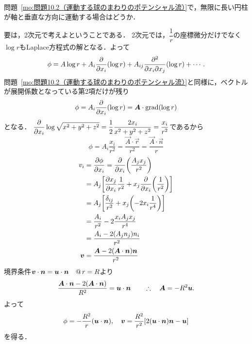 \begin{mondai}{}{}
問題~\ref{mo:問題10.2（運動する球のまわりのポテンシャル流）}で，無限に長い円柱が軸と垂直な方向に運動する場合はどうか．
\end{mondai}
\begin{kaitou}
要は，2次元で考えよということである．
2次元では，$\dfrac{1}{r}$の座標微分だけでなく$\log r$もLaplace方程式の解となる．よって
\[
    \phi = A \log r+ A_i \pdv{x_i}(\log r)  + A_{ij} \pdv{}{x_i}{x_j} {(\log r)} + \cdots .
\]
問題~\ref{mo:問題10.2（運動する球のまわりのポテンシャル流）}と同様に，ベクトルが展開係数となっている第2項だけが残り
\[
    \phi = A_i \pdv{x_i}(\log r) = \vb*{A} \cdot \operatorname{grad} (\log r)
\]
となる．
$\dpdv{x_i} \log\sqrt{x^2+y^2+z^2} = \dfrac{1}{2} \dfrac{2x_i}{x^2+y^2+z^2} = \frac{x_i}{r^2}$であるから
\[
    \phi = A_i \frac{x_i}{r^2} = \frac{\vec{A}\cdot\vec{r}}{r^2} = \frac{\vec{A}\cdot\vec{n}}{r}
\]
\begin{align*}
    v_i &= \pdv{\phi}{x_i} = \pdv{x_i} \pqty{\frac{A_jx_j}{r^2}} \\
    &= A_j \bqty{ \pdv{x_j}{x_i} \frac{1}{r^2} + x_j \pdv{x_i} \pqty{\frac{1}{r^2}}} \\
    &= A_j \bqty{ \frac{\delta_{ij}}{r^2} + x_j \pqty{-2x_i \frac{1}{r^4}} } \\
    &= \frac{A_i}{r^2} - 2\frac{x_iA_jx_j}{r^4} \\
    &= \frac{A_i-2(A_jn_j)n_i}{r^2} \\
    \v &= \frac{\vec{A}-2(\vec{A}\cdot\vec{n})\vec{n}}{r^2}
\end{align*}
境界条件$\vb*{v}\cdot\vb*{n} = \vb*{u}\cdot\vb*{n} \quad @\, r=R$より
\[
    \frac{\vb*{A}\cdot\vb*{n}-2(\vb*{A}\cdot\vb*{n})}{R^2} = \vb*{u}\cdot\vb*{n}
    \qquad\therefore\quad \vb*{A} = - R^2 \vb*{u} .
\]
よって
\[
    \phi= - \frac{R^2}{r}(\vec{u}\cdot\vec{n}), \quad
    \v = \frac{R^2}{r^2} \bqty{ 2(\vec{u}\cdot\vec{n})\vec{n}-\vec{u} }
\]
を得る．


\end{kaitou}
